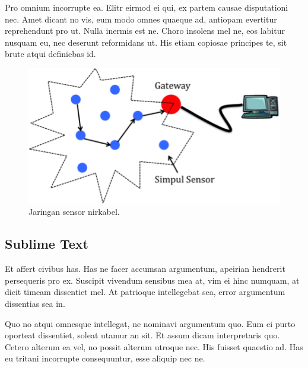     Pro omnium incorrupte ea. Elitr eirmod ei qui, ex partem causae disputationi nec. Amet dicant no vis, eum modo omnes quaeque ad, antiopam evertitur reprehendunt pro ut. Nulla inermis est ne. Choro insolens mel ne, eos labitur nusquam eu, nec deserunt reformidans ut. His etiam copiosae principes te, sit brute atqui definiebas id.


      \begin{figure}[H]
        \centering
          \includegraphics{gambar/wsn}
          \caption{Jaringan sensor nirkabel.}
          \label{wsn}
      \end{figure}


  \subsection{Sublime Text}
    Et affert civibus has. Has ne facer accumsan argumentum, apeirian hendrerit persequeris pro ex. Suscipit vivendum sensibus mea at, vim ei hinc numquam, at dicit timeam dissentiet mel. At patrioque intellegebat sea, error argumentum dissentias sea in.

    Quo no atqui omnesque intellegat, ne nominavi argumentum quo. Eum ei purto oporteat dissentiet, soleat utamur an sit. Et assum dicam interpretaris quo. Cetero alterum ea vel, no possit alterum utroque nec. His fuisset quaestio ad. Has eu tritani incorrupte consequuntur, esse aliquip nec ne.

